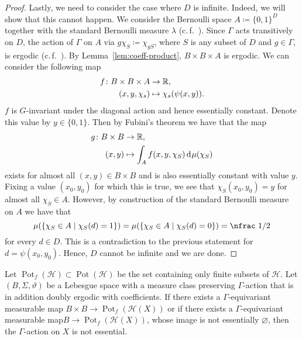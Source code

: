 \begin{proof}
  Lastly, we need to consider the case where \(D\) is infinite. Indeed, we will show that this cannot happen. We consider the Bernoulli space \(A \coloneqq \{0,1\}^D\) together with the standard Bernoulli measure \(\lambda\) (c.\,f.~\cite[29]{Klenke}). Since \(\Gamma\) acts transitively on \(D\), the action of \(\Gamma\) on \(A\) via \(g\chi_S \coloneqq \chi_{gS}\), where \(S\) is any subset of \(D\) and \(g \in \Gamma\), is ergodic (c.\,f.~\cite[Example~20.26]{Klenke}).
  By Lemma~\ref{lem:coeff-product}, \(B \times B \times A\) is ergodic. We can consider the following map
  \begin{align*}
    f\colon B \times B \times A & \to \mathbb{R},\\
    (x,y,\chi_s) & \mapsto \chi_s(\psi(x,y)).
  \end{align*}
  \(f\) is \(G\)-invariant under the diagonal action and hence essentially constant. Denote this value by \(y \in \{0,1\}\). Then by Fubini's theorem we have that the map
  \begin{align*}
    g\colon B \times B & \to \R,\\
    (x,y) & \mapsto \int_A f(x,y,\chi_S) \d\mu(\chi_S)
  \end{align*}
  exists for almost all \((x,y) \in B \times B\) and is also essentially constant with value \(y\). Fixing a value \((x_0, y_0)\) for which this is true, we see that \(\chi_S(x_0,y_0) = y\) for almost all \(\chi_S \in A\). However, by construction of the standard Bernoulli measure on \(A\) we have that
  \[
    \mu(\{\chi_S \in A \mid \chi_S(d) = 1 \}) = \mu(\{\chi_S \in A \mid \chi_S(d) = 0\}) = \text{\nfrac 1/2}
  \]
  for every \(d \in D\). This is a contradiction to the previous statement for \(d = \psi(x_0, y_0)\). Hence, \(D\) cannot be infinite and we are done.
\end{proof}

\begin{cor}[{\cite[Cor. 4.5]{MR3509968}}]
  \label{cor:4.5}
  Let \(\operatorname{Pot}_f(\mathcal{H}) \subset \operatorname{Pot}(\mathcal{H})\) be the set containing only finite subsets of \(\mathcal{H}\). Let \((B, \Sigma, \vartheta)\) be a Lebesgue space with a measure class preserving \(\Gamma\)-action that is in addition doubly ergodic with coefficients. If there exists a \(\Gamma\)-equivariant measurable map \(B \times B \to \operatorname{Pot}_f(\mathcal{H}(X))\) or if there exists a \(\Gamma\)-equivariant measurable map\(B \to \operatorname{Pot}_f(\mathcal{H}(X))\), whose image is not essentially \(\varnothing\), then the \(\Gamma\)-action on \(X\) is not essential.
\end{cor}

